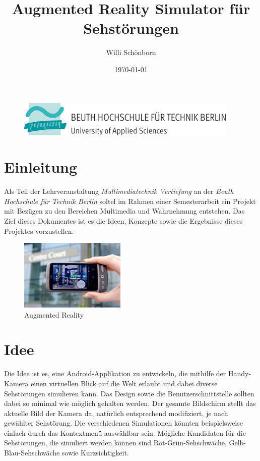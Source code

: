 \documentclass[a4paper]{article}
\title{Augmented Reality Simulator für Sehstörungen}
\author{Willi Schönborn}
\date{\today}
\begin{document}
\begin{figure}[H]
\centering
\includegraphics{beuth.png}
\maketitle
\end{figure}

\section*{Einleitung}
Als Teil der Lehrveranstaltung \textit{Multimediatechnik Vertiefung} an der \textit{Beuth Hochschule für Technik Berlin} soltel im Rahmen einer Semesterarbeit ein Projekt mit Bezügen zu den Bereichen Multimedia und Wahrnehmung entstehen. Das Ziel dieses Dokumentes ist es die Ideen, Konzepte sowie die Ergebnisse dieses Projektes vorzustellen.

\begin{figure}[H]
\centering
\includegraphics[width=0.45\textwidth]{augmented-reality.jpg}
\caption{Augmented Reality}
\end{figure}

\section*{Idee}

Die Idee ist es, eine Android-Applikation zu entwickeln, die mithilfe der Handy-Kamera einen virtuellen Blick auf die Welt erlaubt und dabei diverse Sehstörungen simulieren kann. Das Design sowie die Benutzerschnittstelle sollten dabei so minimal wie möglich gehalten werden. Der gesamte Bildschirm stellt das aktuelle Bild der Kamera da, natürlich entsprechend modifiziert, je nach gewählter Sehstörung. Die verschiedenen Simulationen könnten beispielsweise einfach durch das Kontextmenü auswählbar sein. Mögliche Kandidaten für die Sehstörungen, die simuliert werden können sind Rot-Grün-Sehschwäche, Gelb-Blau-Sehschwäche sowie Kurzsichtigkeit. 
\end{document}
